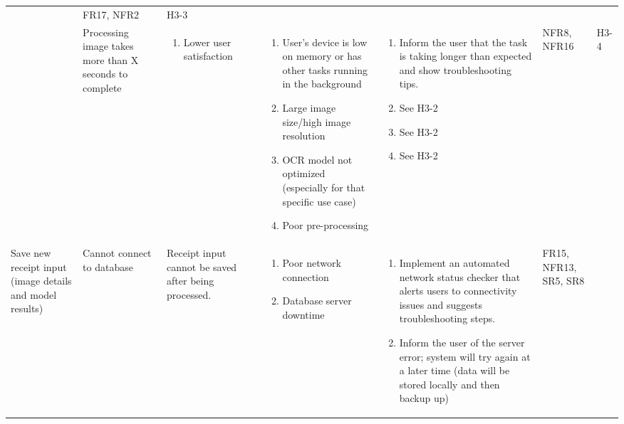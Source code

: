 \documentclass{article}
\begin{document}
\begin{landscape}
\begin{longtable}{|p{3cm}|p{4cm}|p{5cm}|p{5cm}|p{5cm}|p{1cm}|p{0.75cm}|}
\begin{enumerate}[label=(\alph*), leftmargin=0.5cm]
    \end{enumerate} &
    FR17, NFR2 &
    H3-3\\
    \cline{2-7}
    & 
    Processing image takes more than X seconds to complete &
    \begin{enumerate}[label=(\alph*), leftmargin=0.5cm]
        \item Lower user satisfaction
    \end{enumerate} &
    \begin{enumerate}[label=(\alph*), leftmargin=0.5cm]
        \item User’s device is low on memory or has other tasks running in the background
        \item Large image size/high image resolution
        \item OCR model not optimized (especially for that specific use case)
        \item Poor pre-processing  
    \end{enumerate} &
    \begin{enumerate}[label=(\alph*), leftmargin=0.5cm]
        \item Inform the user that the task is taking longer than expected and show troubleshooting tips.
        \item See H3-2
        \item See H3-2
        \item See H3-2
    \end{enumerate} &
    NFR8, NFR16 &
    H3-4\\
    \hline
    Save new receipt input (image details and model results) &
    Cannot connect to database &
    Receipt input cannot be saved after being processed. &
    \begin{enumerate}[label=(\alph*), leftmargin=0.5cm]
        \item Poor network connection
        \item Database server downtime
    \end{enumerate} &
    \begin{enumerate}[label=(\alph*), leftmargin=0.5cm]
        \item Implement an automated network status checker that alerts users to connectivity issues and suggests troubleshooting steps.
        \item Inform the user of the server error; system will try again at a later time (data will be stored locally and then backup up)
    \end{enumerate} &
    FR15, NFR13, SR5, SR8 &

\end{longtable}
\end{landscape}
\end{document}
